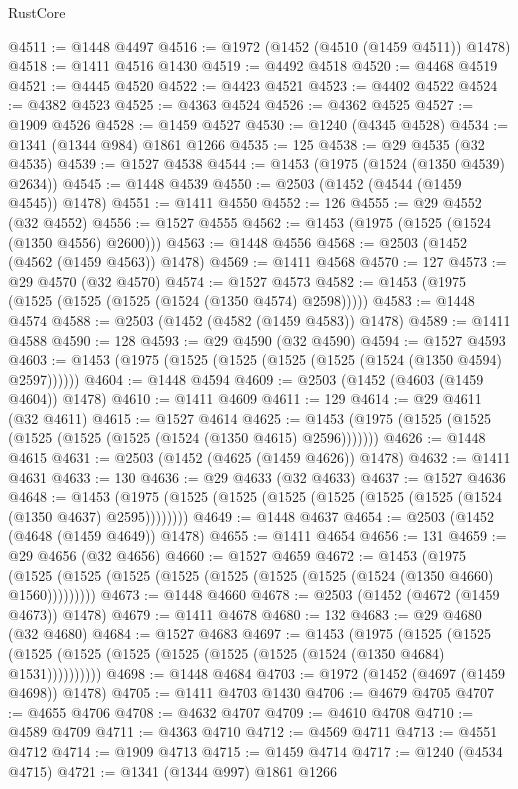 \begin{lexlean}{RustCore}
\begin{coremodule}
@4511 := @1448 @4497
@4516 := @1972 (@1452 (@4510 (@1459 @4511)) @1478)
@4518 := @1411 @4516 @1430
@4519 := @4492 @4518
@4520 := @4468 @4519
@4521 := @4445 @4520
@4522 := @4423 @4521
@4523 := @4402 @4522
@4524 := @4382 @4523
@4525 := @4363 @4524
@4526 := @4362 @4525
@4527 := @1909 @4526
@4528 := @1459 @4527
@4530 := @1240 (@4345 @4528)
@4534 := @1341 (@1344 @984) @1861 @1266
@4535 := 125
@4538 := @29 @4535 (@32 @4535)
@4539 := @1527 @4538
@4544 := @1453 (@1975 (@1524 (@1350 @4539) @2634))
@4545 := @1448 @4539
@4550 := @2503 (@1452 (@4544 (@1459 @4545)) @1478)
@4551 := @1411 @4550
@4552 := 126
@4555 := @29 @4552 (@32 @4552)
@4556 := @1527 @4555
@4562 := @1453 (@1975 (@1525 (@1524 (@1350 @4556) @2600)))
@4563 := @1448 @4556
@4568 := @2503 (@1452 (@4562 (@1459 @4563)) @1478)
@4569 := @1411 @4568
@4570 := 127
@4573 := @29 @4570 (@32 @4570)
@4574 := @1527 @4573
@4582 := @1453 (@1975 (@1525 (@1525 (@1525 (@1524 (@1350 @4574) @2598)))))
@4583 := @1448 @4574
@4588 := @2503 (@1452 (@4582 (@1459 @4583)) @1478)
@4589 := @1411 @4588
@4590 := 128
@4593 := @29 @4590 (@32 @4590)
@4594 := @1527 @4593
@4603 := @1453 (@1975 (@1525 (@1525 (@1525 (@1525 (@1524 (@1350 @4594) @2597))))))
@4604 := @1448 @4594
@4609 := @2503 (@1452 (@4603 (@1459 @4604)) @1478)
@4610 := @1411 @4609
@4611 := 129
@4614 := @29 @4611 (@32 @4611)
@4615 := @1527 @4614
@4625 := @1453 (@1975 (@1525 (@1525 (@1525 (@1525 (@1525 (@1524 (@1350 @4615) @2596)))))))
@4626 := @1448 @4615
@4631 := @2503 (@1452 (@4625 (@1459 @4626)) @1478)
@4632 := @1411 @4631
@4633 := 130
@4636 := @29 @4633 (@32 @4633)
@4637 := @1527 @4636
@4648 := @1453 (@1975 (@1525 (@1525 (@1525 (@1525 (@1525 (@1525 (@1524 (@1350 @4637) @2595))))))))
@4649 := @1448 @4637
@4654 := @2503 (@1452 (@4648 (@1459 @4649)) @1478)
@4655 := @1411 @4654
@4656 := 131
@4659 := @29 @4656 (@32 @4656)
@4660 := @1527 @4659
@4672 := @1453
    (@1975 (@1525 (@1525 (@1525 (@1525 (@1525 (@1525 (@1525 (@1524 (@1350 @4660) @1560)))))))))
@4673 := @1448 @4660
@4678 := @2503 (@1452 (@4672 (@1459 @4673)) @1478)
@4679 := @1411 @4678
@4680 := 132
@4683 := @29 @4680 (@32 @4680)
@4684 := @1527 @4683
@4697 := @1453
    (@1975
      (@1525 (@1525 (@1525 (@1525 (@1525 (@1525 (@1525 (@1525 (@1524 (@1350 @4684) @1531))))))))))
@4698 := @1448 @4684
@4703 := @1972 (@1452 (@4697 (@1459 @4698)) @1478)
@4705 := @1411 @4703 @1430
@4706 := @4679 @4705
@4707 := @4655 @4706
@4708 := @4632 @4707
@4709 := @4610 @4708
@4710 := @4589 @4709
@4711 := @4363 @4710
@4712 := @4569 @4711
@4713 := @4551 @4712
@4714 := @1909 @4713
@4715 := @1459 @4714
@4717 := @1240 (@4534 @4715)
@4721 := @1341 (@1344 @997) @1861 @1266

\end{coremodule}
\end{lexlean}
